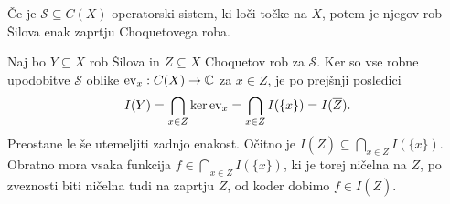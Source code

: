 \begin{posledica}[Choquet]
    Če je $\mathcal{S} \subseteq C(X)$ operatorski sistem, ki loči točke na $X$, potem je 
    njegov rob Šilova enak zaprtju Choquetovega roba.
\end{posledica}

\begin{dokaz}
    Naj bo $Y \subseteq X$ rob Šilova in $Z \subseteq X$ Choquetov rob za $\mathcal{S}$. Ker so vse robne upodobitve $\mathcal{S}$ 
    oblike $\operatorname{ev}_x : C(X) \to \mathbb C$ za $x \in Z$, je po prejšnji posledici 
    \begin{align*}
        I(Y) = \bigcap_{x \in Z} \ker \operatorname{ev}_x = \bigcap_{x \in Z} I(\{x\}) = I(\overline{Z}).
    \end{align*}
    Preostane le še utemeljiti zadnjo enakost. Očitno je $I(\overline{Z}) \subseteq \bigcap_{x \in Z} I(\{x\})$.
    Obratno mora vsaka funkcija $f \in \bigcap_{x \in Z} I(\{x\})$, ki je torej ničelna na $Z$, po zveznosti biti ničelna tudi na zaprtju $\overline{Z}$,
    od koder dobimo $f \in I(\overline{Z})$.
\end{dokaz}

